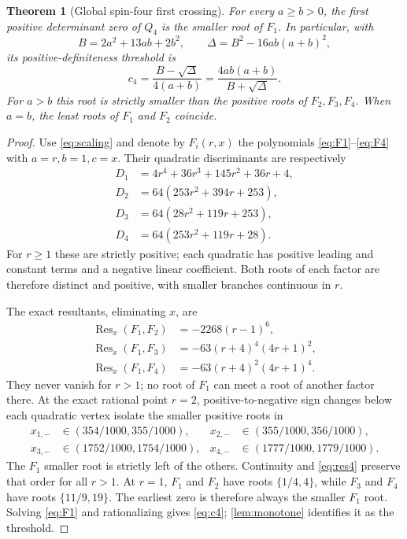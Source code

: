 \documentclass[11pt,a4paper]{article}
\newtheorem{theorem}{Theorem}[section]
\begin{document}
\begin{theorem}[Global spin-four first crossing]\label{thm:spin4}
For every $a\geq b>0$, the first positive determinant zero of
$Q_4$ is the smaller root of $F_1$. In particular, with
\begin{equation}\label{eq:BD}
B=2a^2+13ab+2b^2,
\qquad \Delta=B^2-16ab(a+b)^2,
\end{equation}
its positive-definiteness threshold is
\begin{equation}\label{eq:c4}
\boxed{
 c_4=\frac{B-\sqrt\Delta}{4(a+b)}
 =\frac{4ab(a+b)}{B+\sqrt\Delta}.}
\end{equation}
For $a>b$ this root is strictly smaller than the positive
roots of $F_2,F_3,F_4$. When $a=b$, the least roots of
$F_1$ and $F_2$ coincide.
\end{theorem}
\begin{proof}
Use \eqref{eq:scaling} and denote by $F_i(r,x)$ the
polynomials \eqref{eq:F1}--\eqref{eq:F4} with $a=r,b=1,c=x$.
Their quadratic discriminants are respectively
\begin{align*}
D_1&=4r^4+36r^3+145r^2+36r+4,\\
D_2&=64(253r^2+394r+253),\\
D_3&=64(28r^2+119r+253),\\
D_4&=64(253r^2+119r+28).
\end{align*}
For $r\geq1$ these are strictly positive; each quadratic has
positive leading and constant terms and a negative linear
coefficient. Both roots of each factor are therefore distinct
and positive, with smaller branches continuous in $r$.

The exact resultants, eliminating $x$, are
\begin{align}
\operatorname{Res}_x(F_1,F_2)&=-2268(r-1)^6,\nonumber\\
\operatorname{Res}_x(F_1,F_3)&=-63(r+4)^4(4r+1)^2,\label{eq:res4}\\
\operatorname{Res}_x(F_1,F_4)&=-63(r+4)^2(4r+1)^4.\nonumber
\end{align}
They never vanish for $r>1$; no root of $F_1$ can meet a root
of another factor there. At the exact rational point $r=2$,
positive-to-negative sign changes below each quadratic vertex
isolate the smaller positive roots in
\begin{equation}\label{eq:intervals4}
\begin{aligned}
x_{1,-}&\in(354/1000,355/1000),&
x_{2,-}&\in(355/1000,356/1000),\\
x_{3,-}&\in(1752/1000,1754/1000),&
x_{4,-}&\in(1777/1000,1779/1000).
\end{aligned}
\end{equation}
The $F_1$ smaller root is strictly left of the others.
Continuity and \eqref{eq:res4} preserve that order for all $r>1$.
At $r=1$, $F_1$ and $F_2$ have roots $\{1/4,4\}$, while
$F_3$ and $F_4$ have roots $\{11/9,19\}$.
The earliest zero is therefore always the smaller $F_1$ root.
Solving \eqref{eq:F1} and rationalizing gives \eqref{eq:c4};
\cref{lem:monotone} identifies it as the threshold.
\end{proof}
\end{document}
